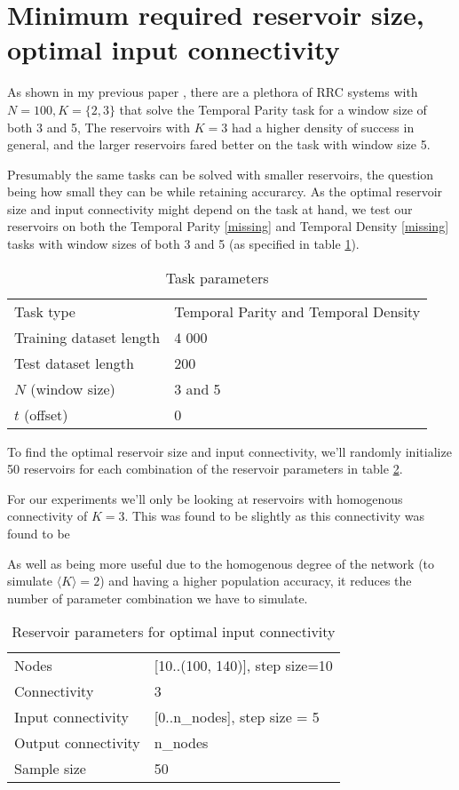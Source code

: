 \section{Minimum required reservoir size, optimal input connectivity}

As shown in my previous paper \cite{MyPreviousPaper},
there are a plethora of RRC systems with $N=100, K=\{2, 3\}$ that solve the Temporal Parity task for a window size of both 3 and 5,
The reservoirs with $K=3$ had a higher density of success in general,
and the larger reservoirs fared better on the task with window size 5.

Presumably the same tasks can be solved with smaller reservoirs,
the question being how small they can be while retaining accurarcy.
As the optimal reservoir size and input connectivity might depend on the task at hand,
we test our reservoirs on both the Temporal Parity \ref{missing} and Temporal Density \ref{missing}
tasks with window sizes of both 3 and 5 (as specified in table \ref{tab:tasks}).

\begin{table}[ht]
  \centering
  \caption{Task parameters}
  \label{tab:tasks}
  \begin{tabular}{ll}
    Task type               & Temporal Parity and Temporal Density \\
    Training dataset length & 4 000                       \\
    Test dataset length     & 200                         \\
    $N$ (window size)       & 3 and 5                     \\
    $t$ (offset)            & 0
  \end{tabular}
\end{table}

To find the optimal reservoir size and input connectivity,
we'll randomly initialize 50 reservoirs for each combination of the reservoir parameters in table \ref{tab:ic-reservoir-parameters}.

For our experiments we'll only be looking at reservoirs with homogenous connectivity of $K=3$.
This was found to be slightly
as this connectivity was found to be 

As well as being more useful due to the homogenous degree of the network (to simulate $\langle K \rangle = 2 $) and
having a higher population accuracy, it reduces the number of parameter combination we have to simulate.

\begin{table}[ht]
    \centering
    \caption{Reservoir parameters for optimal input connectivity}
    \label{tab:ic-reservoir-parameters}
    \begin{tabular}{ll}
        Nodes               & [10..(100, 140)], step size=10 \\
        Connectivity        & 3                              \\
        Input connectivity  & [0..n\_nodes], step size = 5   \\
		Output connectivity & n\_nodes                       \\
        Sample size         & 50
    \end{tabular}
\end{table}

